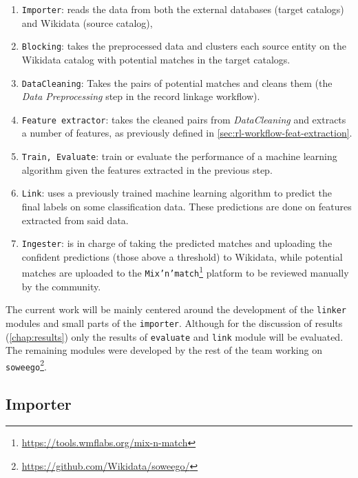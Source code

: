 \documentclass[epsfig,a4paper,11pt,titlepage,twoside,openany]{book}
\newcommand{\footurl}[1]{\footnote{\url{#1}}}
\begin{document}
\begin{enumerate}
\item \texttt{Importer}: 
reads the data from both the external databases (target catalogs) and Wikidata (source catalog),

\item \texttt{Blocking}: 
takes the preprocessed data and clusters each source entity on the Wikidata catalog with potential matches in the target catalogs.

\item \texttt{DataCleaning}: 
Takes the pairs of potential matches and cleans them (the \textit{Data Preprocessing} step in the record linkage workflow).
  
\item \texttt{Feature extractor}: 
takes the cleaned pairs from \textit{DataCleaning} and extracts a number of features, as previously defined in \autoref{sec:rl-workflow-feat-extraction}.
 
\item \texttt{Train, Evaluate}:
train or evaluate the performance of a machine learning algorithm given the features extracted in the previous step.

\item \texttt{Link}:
uses a previously trained machine learning algorithm to predict the final labels on some classification data. These predictions are done on features extracted from said data.
 
\item \texttt{Ingester}: 
is in charge of taking the predicted matches and uploading the confident predictions (those above a threshold) to Wikidata, while potential matches are uploaded to the \texttt{Mix'n'match}\footurl{https://tools.wmflabs.org/mix-n-match} platform to be reviewed manually by the community.
\end{enumerate}

The current work will be mainly centered around the development of the \texttt{linker} modules and small parts of the \texttt{importer}. Although for the discussion of results  (\autoref{chap:results}) only the results of  \texttt{evaluate} and \texttt{link} module will be evaluated.  The remaining modules were developed by the rest of the team working on \texttt{soweego}\footurl{https://github.com/Wikidata/soweego/}.


\subsection{Importer}
\label{sec:soweego-st-importer}
\end{document}
